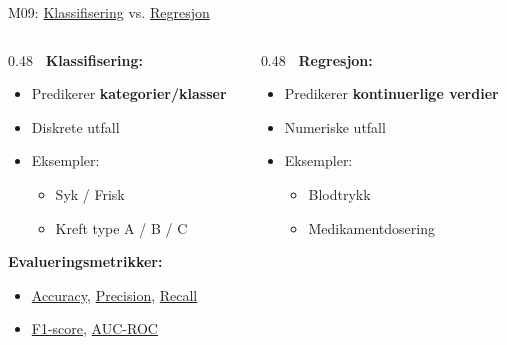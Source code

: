\documentclass[aspectratio=169, 10pt]{beamer}
\begin{document}
\begin{frame}{M09: \href{https://en.wikipedia.org/wiki/Statistical_classification}{Klassifisering} vs. \href{https://en.wikipedia.org/wiki/Regression_analysis}{Regresjon}}

    \begin{columns}
        \begin{column}{0.48\textwidth}
            \textbf{\faThLarge\ Klassifisering:}
            \begin{itemize}
                \item Predikerer \textbf{kategorier/klasser}
                \item Diskrete utfall
                \item Eksempler:
                \begin{itemize}
                    \item Syk / Frisk
                    \item Kreft type A / B / C
                \end{itemize}
            \end{itemize}

            \vspace{2mm}
            \textbf{Evalueringsmetrikker:}
            \footnotesize
            \begin{itemize}
                \item \href{https://en.wikipedia.org/wiki/Accuracy_and_precision\#In_classification}{Accuracy}, \href{https://en.wikipedia.org/wiki/Precision_and_recall\#Precision}{Precision}, \href{https://en.wikipedia.org/wiki/Precision_and_recall\#Recall}{Recall}
                \item \href{https://en.wikipedia.org/wiki/F-score}{F1-score}, \href{https://en.wikipedia.org/wiki/Receiver_operating_characteristic}{AUC-ROC}
            \end{itemize}
        \end{column}

        \begin{column}{0.48\textwidth}
            \textbf{\faChartLine\ Regresjon:}
            \begin{itemize}
                \item Predikerer \textbf{kontinuerlige verdier}
                \item Numeriske utfall
                \item Eksempler:
                \begin{itemize}
                    \item Blodtrykk
                    \item Medikamentdosering
                \end{itemize}
            \end{itemize}


\end{column}
\end{columns}
\end{frame}
\end{document}
